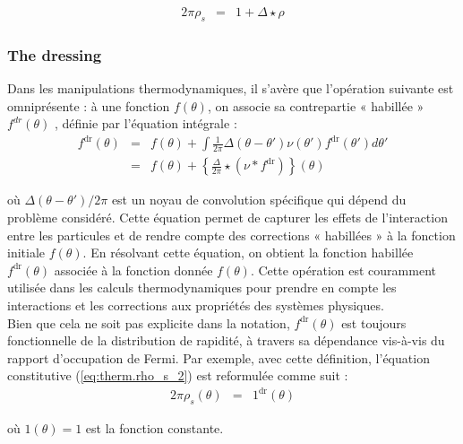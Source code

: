 \begin{eqnarray*}
	2\pi \rho_s & = & 1 + \Delta \star \rho 
\end{eqnarray*}

\subsubsection{The dressing}

Dans les manipulations thermodynamiques, il s'avère que l'opération suivante est omniprésente : à une fonction $f(\theta)$, on associe sa contrepartie « habillée » $f^{dr}(\theta)$
, définie par l'équation intégrale :
\begin{eqnarray}
	f^{\mathrm{dr}}(\theta) & = & f(\theta) + \int \frac{1}{2\pi} \Delta( \theta - \theta' ) \nu ( \theta' ) f^{\mathrm{dr}}(\theta') d \theta ' \\
	& = & 	f(\theta) + \left \{ \frac{\Delta}{2\pi} \star (\nu \ast f^{\mathrm{dr}}) \right \} ( \theta ) 		
\end{eqnarray}


où $\Delta ( \theta - \theta' )/2\pi$ est un noyau de convolution spécifique qui dépend du problème considéré. Cette équation permet de capturer les effets de l'interaction entre les particules et de rendre compte des corrections « habillées » à la fonction initiale $f(\theta)$. En résolvant cette équation, on obtient la fonction habillée $f^{\mathrm{dr}}(\theta)$ associée à la fonction donnée $f(\theta)$. Cette opération est couramment utilisée dans les calculs thermodynamiques pour prendre en compte les interactions et les corrections aux propriétés des systèmes physiques.\\


Bien que cela ne soit pas explicite dans la notation, $f^{\mathrm{dr}}(\theta)$ est toujours fonctionnelle de la distribution de rapidité, à travers sa dépendance vis-à-vis du rapport d'occupation de Fermi. Par exemple, avec cette définition, l'équation constitutive (\ref{eq:therm.rho_s_2}) est reformulée comme suit :
\begin{eqnarray}
	2\pi \rho_s ( \theta ) & = & \mathrm{1}^{\mathrm{dr}}(\theta)		
\end{eqnarray}

où $\mathrm{1}(\theta) = 1$ est la fonction constante.
